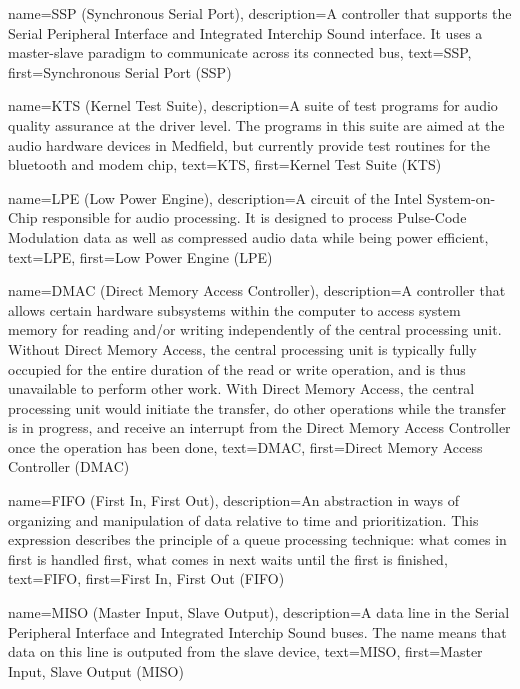 {
  name=SSP (Synchronous Serial Port),
  description={A controller that supports the Serial Peripheral
    Interface and Integrated Interchip Sound interface. It uses a
    master-slave paradigm to communicate across its connected bus},
  text=SSP,
  first=Synchronous Serial Port (SSP)
}


{
  name=KTS (Kernel Test Suite),
  description={A suite of test programs for audio quality assurance at
    the driver level. The programs in this suite are aimed at the
    audio hardware devices in Medfield, but currently provide test
    routines for the bluetooth and modem chip},
  text=KTS,
  first=Kernel Test Suite (KTS)
}


{
  name=LPE (Low Power Engine),
  description={A circuit of the Intel System-on-Chip responsible for
    audio processing. It is designed to process Pulse-Code Modulation
    data as well as compressed audio data while being power efficient},
  text=LPE,
  first=Low Power Engine (LPE)
}

{
  name=DMAC (Direct Memory Access Controller),
  description={A controller that allows certain hardware subsystems
    within the computer to access system memory for reading and/or
    writing independently of the central processing unit. Without
    Direct Memory Access, the central processing unit is typically
    fully occupied for the entire duration of the read or write
    operation, and is thus unavailable to perform other work. With
    Direct Memory Access, the central processing unit would initiate
    the transfer, do other operations while the transfer is in
    progress, and receive an interrupt from the Direct Memory Access
    Controller once the operation has been done},
  text=DMAC,
  first=Direct Memory Access Controller (DMAC)
}

{
  name={FIFO (First In, First Out)},
  description={An abstraction in ways of organizing and manipulation
    of data relative to time and prioritization. This expression
    describes the principle of a queue processing technique: what
    comes in first is handled first, what comes in next waits until
    the first is finished},
  text=FIFO,
  first={First In, First Out (FIFO)}
}

{
  name={MISO (Master Input, Slave Output)},
  description={A data line in the Serial Peripheral Interface and
    Integrated Interchip Sound buses. The name means that data on this
    line is outputed from the slave device},
  text=MISO,
  first={Master Input, Slave Output (MISO)}
}

